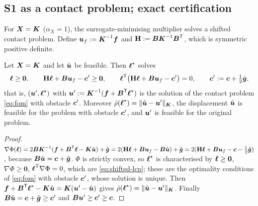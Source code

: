 \subsection{S1 as a contact problem; exact certification}\label{sec:s1-contact}

For $\mX=\mK$ ($\alpha_X=1$), the surrogate-minimising multiplier solves a shifted contact problem. Define
$\vu_f:=\mK^{-1}\vf$ and $\mathbf H:=\mB\mK^{-1}\mB\T$, which is symmetric positive definite.

\begin{proposition}\label{prop:shifted}
Let $\mX=\mK$ and let $\uh$ be feasible. Then $\lmr$ solves
\begin{equation}\label{eq:shifted-lcp}
  \vell\ge\boldsymbol 0,\qquad \mathbf H\vell+\mB\vu_f-\vc'\ge\boldsymbol 0,\qquad \vell\T\big(\mathbf H\vell+\mB\vu_f-\vc'\big)=0,\qquad
  \vc':=\vc+\tfrac12\gh ,
\end{equation}
that is, $(\vu',\lmr)$ with $\vu':=\mK^{-1}(\vf+\mB\T\lmr)$ is the solution of the contact problem \eqref{eq:fom} with obstacle $\vc'$.
Moreover $\rhob(\lmr)=\normK{\uh-\vu'}$, the displacement $\uh$ is feasible for the problem with obstacle $\vc'$, and $\vu'$ is feasible for the
original problem.
\end{proposition}
\begin{proof}
$\nabla\Phi(\vell)=2\mB\mK^{-1}(\vf+\mB\T\vell-\mK\uh)+\gh=2(\mathbf H\vell+\mB\vu_f-\mB\uh)+\gh=2(\mathbf H\vell+\mB\vu_f-\vc-\tfrac12\gh)$, because $\mB\uh=\vc+\gh$.
$\Phi$ is strictly convex, so $\lmr$ is characterised by $\vell\ge\boldsymbol 0$, $\nabla\Phi\ge\boldsymbol 0$, $\vell\T\nabla\Phi=0$, which are \eqref{eq:shifted-lcp}; these are the
optimality conditions of \eqref{eq:fom} with obstacle $\vc'$, whose solution is unique. Then $\vf+\mB\T\lmr-\mK\uh=\mK(\vu'-\uh)$ gives
$\rhob(\lmr)=\normK{\uh-\vu'}$. Finally $\mB\uh=\vc+\gh\ge\vc'$ and $\mB\vu'\ge\vc'\ge\vc$.
\end{proof}

